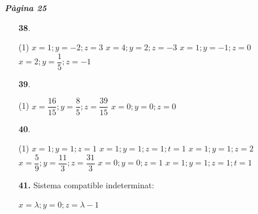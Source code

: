 \documentclass[a4paper, pdf, twoside]{book}
\begin{document}
\begin{multicols}{2}

{\textbf{\em Pàgina 25}} \hrulefill
\begin{enumerate}
\vspace{0.25cm}



 \item[\fontfamily{phv}\selectfont\color{blue}\textbf{38}. ]  \scalebox{0.6}{\simbolclau } 
 \begin{tasks}[column-sep=1em, item-indent=1.3333em](1)
	 \task  $x=1; y=-2; z=3$
	 \task $x=4; y=2; z=-3$
	 \task $x=1; y=-1; z=0$
	 \task $x=2; y=\dfrac {1}{5}; z=-1$ 
\end{tasks}
 \end{enumerate}
\begin{enumerate}
\vspace{0.25cm}



 \item[\fontfamily{phv}\selectfont\color{blue}\textbf{39}. ] 
 \begin{tasks}[column-sep=1em, item-indent=1.3333em](1)
	 \task*  $x=\dfrac {16}{15}; y=\dfrac {8}{5}; z=\dfrac {39}{15}$
	 \task $x=0; y=0; z=0$ 
\end{tasks}
\vspace{0.25cm}



 \item[\fontfamily{phv}\selectfont\color{blue}\textbf{40}. ] 
 \begin{tasks}[column-sep=1em, item-indent=1.3333em](1)
	 \task  $x=1; y=1; z=1$
	 \task $x=1; y=1; z=1; t=1$
	 \task $x=1; y=1; z=2$
	 \task* $x=\dfrac {5}{9}; y=\dfrac {11}{3}; z=\dfrac {31}{3}$ $x=0; y=0; z=1$
	 \task $x=1; y=1; z=1; t=1$ 
\end{tasks}
\vspace{0.25cm}
\item[\fontfamily{phv}\selectfont\color{blue}\textbf{41. }] 
Sistema compatible indeterminat:\par $x=\lambda ; y=0; z=\lambda -1$
 \end{enumerate}
\vspace{0.3cm}



\end{multicols}
\end{document}
